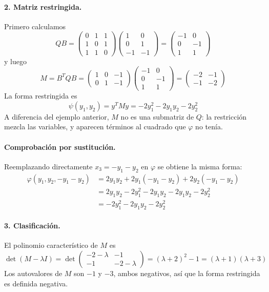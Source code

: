 \documentclass{article}
\begin{document}
\paragraph*{2. Matriz restringida.}
Primero calculamos
\[
QB=
\begin{pmatrix}
0 & 1 & 1\\
1 & 0 & 1\\
1 & 1 & 0
\end{pmatrix}
\begin{pmatrix}
1 & 0\\
0 & 1\\
-1 & -1
\end{pmatrix}
=
\begin{pmatrix}
-1 & 0\\
0 & -1\\
1 & 1
\end{pmatrix}
\]
y luego
\[
M=B^TQB=
\begin{pmatrix}
1 & 0 & -1\\
0 & 1 & -1
\end{pmatrix}
\begin{pmatrix}
-1 & 0\\
0 & -1\\
1 & 1
\end{pmatrix}
=
\begin{pmatrix}
-2 & -1\\
-1 & -2
\end{pmatrix}
\]
La forma restringida es
\[
\psi(y_1,y_2)=y^TMy=-2y_1^2-2y_1y_2-2y_2^2
\]
A diferencia del ejemplo anterior, \(M\) no es una submatriz de \(Q\): la restricción mezcla las variables, y aparecen términos al cuadrado que \(\varphi\) no tenía.

\paragraph*{Comprobación por sustitución.}
Reemplazando directamente \(x_3=-y_1-y_2\) en \(\varphi\) se obtiene la misma forma:
\[
\begin{aligned}
\varphi(y_1,y_2,-y_1-y_2)
&=2y_1y_2+2y_1(-y_1-y_2)+2y_2(-y_1-y_2)\\
&=2y_1y_2-2y_1^2-2y_1y_2-2y_1y_2-2y_2^2\\
&=-2y_1^2-2y_1y_2-2y_2^2
\end{aligned}
\]

\paragraph*{3. Clasificación.}
El polinomio característico de \(M\) es
\[
\det(M-\lambda I)
=
\det\begin{pmatrix}
-2-\lambda & -1\\
-1 & -2-\lambda
\end{pmatrix}
=(\lambda+2)^2-1
=(\lambda+1)(\lambda+3)
\]
Los autovalores de \(M\) son \(-1\) y \(-3\), ambos negativos, así que la forma restringida es definida negativa.
\end{document}
